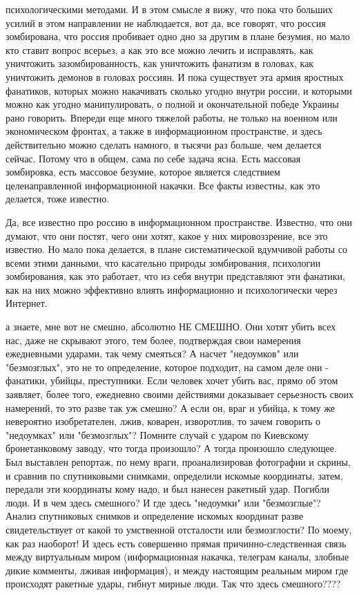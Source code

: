 психологическими методами. И в этом смысле я вижу, что пока что больших усилий
в этом направлении не наблюдается, вот да, все говорят, что россия зомбирована,
что россия пробивает одно дно за другим в плане безумия, но мало кто ставит
вопрос всерьез, а как это все можно лечить и исправлять, как уничтожить
зазомбированность, как уничтожить фанатизм в головах, как уничтожить демонов в
головах россиян. И пока существует эта армия яростных фанатиков, которых можно
накачивать сколько угодно внутри россии, и которыми можно как угодно
манипулировать, о полной и окончательной победе Украины рано говорить. Впереди
еще много тяжелой работы, не только на военном или экономическом фронтах, а
также в информационном пространстве, и здесь действительно можно сделать
намного, в тысячи раз больше, чем делается сейчас. Потому что в общем, сама по
себе задача ясна. Есть массовая зомбировка, есть массовое безумие, которое
является следствием целенаправленной информационной накачки. Все факты
известны, как это делается, тоже известно.

Да, все известно про россию в информационном пространстве. Известно, что они
думают, что они постят, чего они хотят, какое у них мировоззрение, все это
известно. Но мало пока делается, в плане систематической вдумчивой работы со
всеми этими данными, что касательно природы зомбирования, психологии
зомбирования, как это работает, что из себя внутри представляют эти фанатики,
как на них можно эффективно влиять информационно и психологически через
Интернет.




а знаете, мне вот не смешно, абсолютно НЕ СМЕШНО. Они хотят убить всех нас,
даже не скрывают этого, тем более, подтверждая свои намерения ежедневными
ударами, так чему смеяться? А насчет "недоумков" или "безмозглых", это не то
определение, которое подходит, на самом деле они - фанатики, убийцы,
преступники. Если человек хочет убить вас, прямо об этом заявляет, более того,
ежедневно своими действиями доказывает серьезность своих намерений, то это
разве так уж смешно? А если он, враг и убийца, к тому же невероятно
изобретателен, лжив, коварен, изворотлив, то зачем говорить о "недоумках" или
"безмозглых"? Помните случай с ударом по Киевскому бронетанковому заводу, что
тогда произошло? А тогда произошло следующее. Был выставлен репортаж, по нему
враги, проанализировав фотографии и скрины, и сравнив по спутниковыми снимками,
определили искомые координаты, затем, передали эти координаты кому надо, и был
нанесен ракетный удар. Погибли люди. И в чем здесь смешного? И где здесь
"недоумки" или "безмозглые"? Анализ спутниковых снимков и определение искомых
координат разве свидетельствует от какой то умственной отсталости или
безмозглости? По моему, как раз наоборот! И здесь есть совершенно прямая
причинно-следственная связь между виртуальным миром (информационная накачка,
телеграм каналы, злобные дикие комменты, лживая информация), и между настоящим
реальным миром где происходят ракетные удары, гибнут мирные люди. Так что здесь
смешного????

